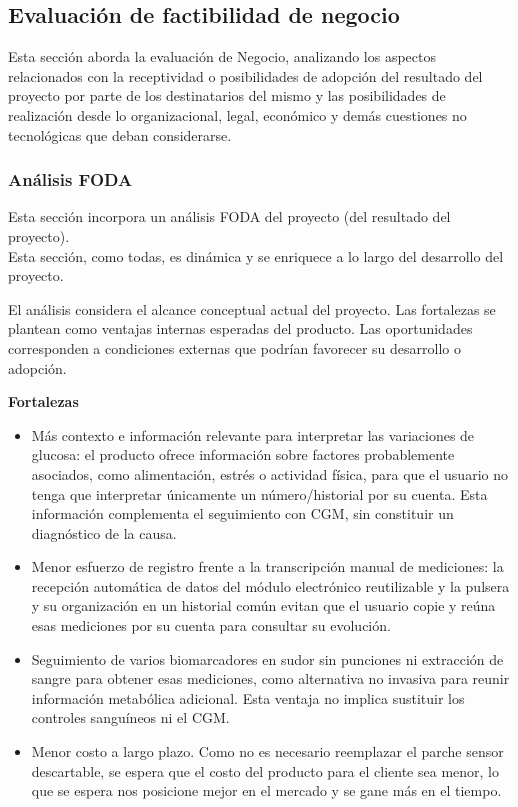 \subsection{Evaluación de factibilidad de negocio}
{\consigna
Esta sección aborda la evaluación de Negocio, analizando los aspectos relacionados con la receptividad o posibilidades de adopción del resultado del proyecto por parte de los destinatarios del mismo y las posibilidades de realización desde lo organizacional, legal, económico y demás cuestiones no tecnológicas que deban considerarse.
}

\newpage


\subsubsection{Análisis FODA}
{\consigna
Esta sección incorpora un análisis FODA del proyecto (del resultado del proyecto).\\
Esta sección, como todas, es dinámica y se enriquece a lo largo del desarrollo del proyecto.
}

El análisis considera el alcance conceptual actual del proyecto. Las fortalezas se plantean como ventajas internas esperadas del producto. Las oportunidades corresponden a condiciones externas que podrían favorecer su desarrollo o adopción.

\noindent\textbf{Fortalezas}
\begin{itemize}
    \item Más contexto e información relevante para interpretar las variaciones de glucosa: el producto ofrece información sobre factores probablemente asociados, como alimentación, estrés o actividad física, para que el usuario no tenga que interpretar únicamente un número/historial por su cuenta. Esta información complementa el seguimiento con CGM, sin constituir un diagnóstico de la causa.
    \item Menor esfuerzo de registro frente a la transcripción manual de mediciones: la recepción automática de datos del módulo electrónico reutilizable y la pulsera y su organización en un historial común evitan que el usuario copie y reúna esas mediciones por su cuenta para consultar su evolución.
    \item Seguimiento de varios biomarcadores en sudor sin punciones ni extracción de sangre para obtener esas mediciones, como alternativa no invasiva para reunir información metabólica adicional. Esta ventaja no implica sustituir los controles sanguíneos ni el CGM.
    \item Menor costo a largo plazo. Como no es necesario reemplazar el parche sensor descartable, se espera que el costo del producto para el cliente sea menor, lo que se espera nos posicione mejor en el mercado y se gane más en el tiempo. 
\end{itemize}

